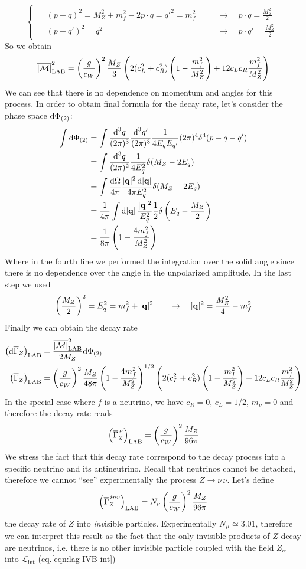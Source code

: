 \documentclass[TheoreticalPhy_ModB.tex]{subfiles}
\begin{document}
\begin{example}
\[\begin{cases}
\begin{alignedat}{2}
&(p-q)^2=M_Z^2+m_f^2-2p\cdot q=q'^2=m_f^2&&\quad\to\quad p\cdot q=\frac{M_Z^2}2\\
&(p-q')^2=q^2&&\quad\to\quad p\cdot q'=\frac{M_Z^2}2
\end{alignedat}\end{cases}\]
So we obtain
\[\overline{\vert\mathcal M\vert}^2_{\text{LAB}}=\left(\frac g{c_W}\right)^2\frac{M_Z}3\left(2(c_L^2+c_R^2)\left(1-\frac{m_f^2}{M_Z^2}\right)+12c_Lc_R\frac{m_f^2}{M_Z^2}\right)\]
We can see that there is no dependence on momentum and angles for this process. In order to obtain final formula for the decay rate, let's consider the phase space $\textup{d}\Phi_{(2)}$:
\begin{align*}
\int\textup{d}\Phi_{(2)}
&=\int\frac{\textup{d}^3q}{(2\pi)^3}\frac{\textup{d}^3q'}{(2\pi)^3}\frac1{4E_qE_{q'}}(2\pi)^4\delta^4(p-q-q')\\
&=\int\frac{\textup{d}^3q}{(2\pi)^2}\frac1{4E_q^2}\delta(M_Z-2E_q)\\
&=\int\frac{\textup{d}\Omega}{4\pi }\frac{|\mathbf q|^2\,\textup{d}|\mathbf q|}{4\pi E_q^2}\delta(M_Z-2E_q)\\
&=\frac1{4\pi}\int\textup{d}|\mathbf q|\,\frac{|\mathbf q|^2}{E_q^2}\frac12\delta\left(E_q-\frac{M_Z}2\right)\\
&=\frac1{8\pi}\left(1-\frac{4m_f^2}{M_Z^2}\right)
\end{align*}
Where in the fourth line we performed the integration over the solid angle since there is no dependence over the angle in the unpolarized amplitude. In the last step we used 
\[\left(\frac{M_Z}2\right)^2=E_q^2=m_f^2+|\mathbf q|^2\qquad\to\quad |\mathbf q|^2=\frac{M_Z^2}{4}-m_f^2\]
Finally we can obtain the decay rate
\begin{align*}
\left(\textup{d}\overline\Gamma_Z\right)_{\text{LAB}}
&=\frac{\overline{\vert\mathcal M\vert}^2_{\text{LAB}}}{2M_Z}\textup{d}\Phi_{(2)}\\
\left(\overline\Gamma_Z\right)_{\text{LAB}}&=\left(\frac g{c_W}\right)^2\frac{M_Z}{48\pi}\left(1-\frac{4m_f^2}{M_Z^2}\right)^{1/2}\left(2(c_L^2+c_R^2)\left(1-\frac{m_f^2}{M_Z^2}\right)+12c_Lc_R\frac{m_f^2}{M_Z^2}\right)
\end{align*}
In the special case where $f$ is a neutrino, we have $c_R=0$, $c_L=1/2$, $m_\nu=0$ and therefore the decay rate reads
\[ \left(\overline\Gamma_Z^{\,\nu}\right)_{\text{LAB}}=\left(\frac g{c_W}\right)^2\frac{M_Z}{96\pi}\]
We stress the fact that this decay rate correspond to the decay process into a specific neutrino and its antineutrino. Recall that neutrinos cannot be detached, therefore we cannot ``see'' experimentally the process $Z\to\nu\,\bar\nu$. Let's define 
\[ \left(\overline\Gamma_Z^{\,inv}\right)_{\text{LAB}}=N_\nu\left(\frac g{c_W}\right)^2\frac{M_Z}{96\pi}\]
the decay rate of $Z$ into \emph{inv}isible particles. Experimentally $N_\mu\simeq3.01$, therefore we can interpret this result as the fact that the only invisible products of $Z$ decay are neutrinos, i.e. there is no other invisible particle  coupled with the field $Z_\alpha$ into $\mathcal L_{\text{int}}$ (eq.\eqref{eqn:lag-IVB-int})
\end{example}
\end{document}
